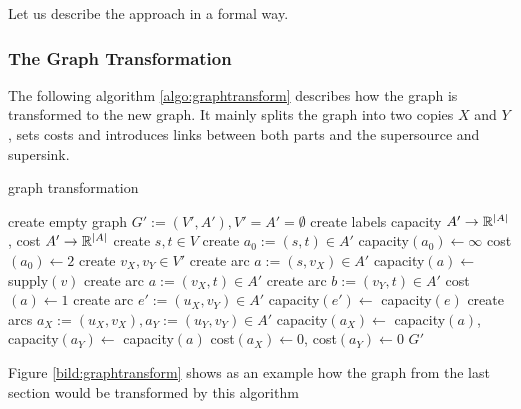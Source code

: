 Let us describe the approach in a formal way.

\subsubsection*{The Graph Transformation}

The following algorithm \ref{algo:graphtransform} describes how the graph is transformed to the new graph. It mainly 
splits the graph into two copies $X$ and $Y$, sets costs and introduces links between both parts and the 
supersource and supersink.

\begin{algorithm}
 \caption{graph transformation}
 \label{algo:graphtransform}
 \begin{algorithmic}[5]
  \State create empty graph $G':=(V',A'), V'=A'=\emptyset$
  \State create labels capacity $A'\to \mathbb{R}^{|A|}$, cost $A'\to \mathbb{R}^{|A|}$%
  \State create $s, t\in V$ 
  \State create $a_0 :=(s,t) \in A'$
  \State capacity$(a_0)\gets\infty$ 
  \State cost$(a_0)\gets 2$ 
    \State create $v_X, v_Y\in V'$
      \State create arc $a:=(s,v_X)\in A'$
      \State capacity$(a)\gets$ supply$(v)$
      \State create arc $a:=(v_X, t)\in A'$
      \State create arc $b:=(v_Y,t)\in A'$
      \State cost$(a)\gets 1$
    \EndIf
  \EndFor
      \State create arc $e':=(u_X, v_Y)\in A'$
      \State capacity$(e')\gets$ capacity$(e)$
    \Else
      \State create arcs $a_X:=(u_X, v_X), a_Y:=(u_Y, v_Y)\in A'$
      \State capacity$(a_X)\gets$ capacity$(a)$, capacity$(a_Y)\gets$ capacity$(a)$
      \State cost$(a_X)\gets 0$, cost$(a_Y)\gets0$
    \EndIf
  \EndFor
  \State \Return $G'$
  \EndFunction
 \end{algorithmic}

\end{algorithm}

Figure \ref{bild:graphtransform} shows as an example how the graph from the last section would be transformed by this 
algorithm

